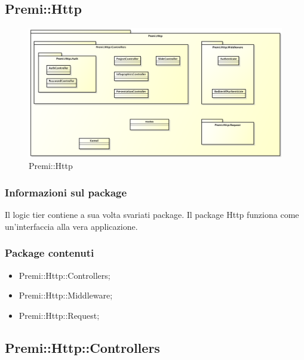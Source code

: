 \newpage
\subsection{Premi::Http}
		\begin{figure}[h]
			\centering
			\includegraphics[width=0.9\linewidth]{img/premi_http}
			\caption[Premi::Http]{Premi::Http}
			\label{fig:premi_http}
		\end{figure}

	\subsubsection*{Informazioni sul package}
	 Il logic tier contiene a sua volta svariati package. Il package Http funziona come un'interfaccia alla vera applicazione.
	 \subsubsection*{Package contenuti}
		 \begin{itemize}
		 	\item Premi::Http::Controllers;
		 	\item Premi::Http::Middleware;
		 	\item Premi::Http::Request;
		 \end{itemize}

\newpage
\subsection{Premi::Http::Controllers}
